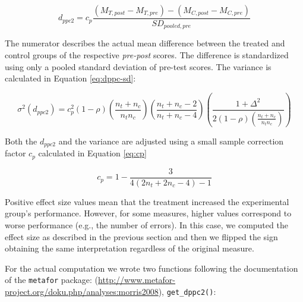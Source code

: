 \documentclass[
]{article}
\begin{document}
\begin{equation} 
  d_{ppc2} = c_p \frac{(M_{T,post} - M_{T,pre}) - (M_{C,post} - M_{C,pre})}{SD_{pooled,pre}}
  \label{eq:dppc}
\end{equation}

The numerator describes the actual mean difference between the treated and control groups of the respective \emph{pre-post} scores. The difference is standardized using only a pooled standard deviation of pre-test scores. The variance is calculated in Equation \eqref{eq:dppc-sd}:

\begin{equation} 
  \sigma^2(d_{ppc2}) = c^2_p(1-\rho)(\frac{n_t+n_c}{n_t n_c})(\frac{n_t+n_c-2}{n_t+n_c-4})(\frac{1 + \Delta^2}{2(1-\rho)(\frac{n_t+n_c}{n_t n_c})})
  \label{eq:dppc-sd}
\end{equation}

Both the \(d_{ppc2}\) and the variance are adjusted using a small sample correction factor \(c_p\) calculated in Equation \eqref{eq:cp}

\begin{equation} 
  c_p = 1 - \frac{3}{4(2n_t + 2n_c - 4) - 1}
  \label{eq:cp}
\end{equation}

Positive effect size values mean that the treatment increased the experimental group's performance. However, for some measures, higher values correspond to worse performance (e.g., the number of errors). In this case, we computed the effect size as described in the previous section and then we flipped the sign obtaining the same interpretation regardless of the original measure.

For the actual computation we wrote two functions following the documentation of the \texttt{metafor} package: (\url{http://www.metafor-project.org/doku.php/analyses:morris2008}), \texttt{get\_dppc2()}:
\end{document}
